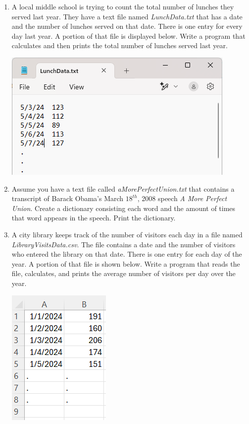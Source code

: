 \documentclass{article}
\begin{document}
\begin{enumerate}
	\item 
		A local middle school is trying to count the total number of lunches they served last year.  
		They have a text file named \textit{LunchData.txt} that has a date and the number of lunches served on that date.    
		There is one entry for every day last year.  A portion of that file is displayed below.  
		Write a program that calculates and then prints the total number of lunches served last year. 
		\begin{flushright}
			\includegraphics[scale=.65]{imgs/LunchData.PNG}
		\end{flushright}





	\item
		Assume you have a text file called \textit{aMorePerfectUnion.txt} that contains a transcript of Barack Obama's 
		March $18^{th}$, 2008 speech \textit{A More Perfect Union}. Create a dictionary consisting each word and the 
		amount of times that word appears in the speech. Print the dictionary.


	\item 
		A city library keeps track of the number of visitors each day in a file named \textit{LibraryVisitsData.csv}.  
		The file contains a date and the number of visitors who entered the library on that date.  
		There is one entry for each day of the year. A portion of that file is shown below.  
		Write a program that reads the file, calculates, and prints the average number of visitors per day over the year.
		
		\begin{flushright}
			\includegraphics[scale=.65]{imgs/LibraryVisitsData.PNG}
		\end{flushright}



\end{enumerate}
\end{document}
